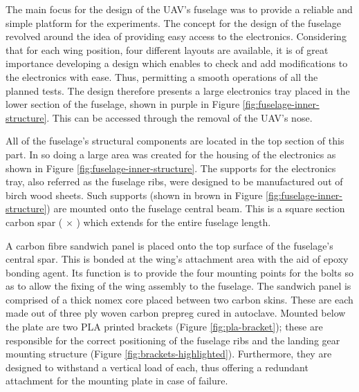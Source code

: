 \documentclass[../../main.tex]{subfiles}
\begin{document}
The main focus for the design of the UAV's fuselage was to provide a reliable and simple platform for the experiments.
The concept for the design of the fuselage revolved around the idea of providing easy access to the electronics.
Considering that for each wing position, four different layouts are available, it is of great importance developing a design which enables to check and add modifications to the electronics with ease.
Thus, permitting a smooth operations of all the planned tests.
The design therefore presents a large electronics tray placed in the lower section of the fuselage, shown in purple in Figure \ref{fig:fuselage-inner-structure}.
This can be accessed through the removal of the UAV's nose.



All of the fuselage's structural components are located in the top section of this part.
In so doing a large area was created for the housing of the electronics as shown in Figure \ref{fig:fuselage-inner-structure}.
The supports for the electronics tray, also referred as the fuselage ribs, were designed to be manufactured out of  birch wood sheets.
Such supports (shown in brown in Figure \ref{fig:fuselage-inner-structure}) are mounted onto the fuselage central beam.
This is a square section carbon spar ( $\times$ ) which extends for the entire fuselage length. 

A carbon fibre sandwich panel is placed onto the top surface of the fuselage's central spar.
This is bonded at the wing's attachment area with the aid of epoxy bonding agent.
Its function is to provide the four mounting points for the bolts so as to allow the fixing of the wing assembly to the fuselage.
The sandwich panel is comprised of a  thick nomex core placed between two carbon skins.
These are each made out of three ply woven carbon prepreg cured in autoclave.
Mounted below the plate are two PLA printed brackets (Figure \ref{fig:pla-bracket}); these are responsible for the correct positioning of the fuselage ribs and the landing gear mounting structure (Figure \ref{fig:brackets-highlighted}).
Furthermore, they are designed to withstand a vertical load of  each, thus offering a redundant attachment for the mounting plate in case of failure.
\end{document}
